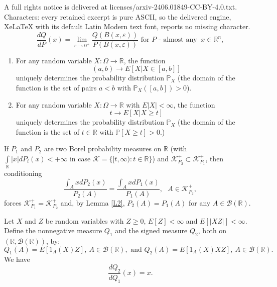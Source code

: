 \documentclass[10pt,a4paper]{amsart}
\newcommand{\B}{\mathcal{B}(\R)}
\newcommand{\KK}{\mathcal{K}}
\newcommand{\PP}{\mathbb{P}}
\newcommand{\R}{\mathbb{R}}
\newcommand{\eps}{\varepsilon}
\begin{document}
A full rights notice is delivered at licenses/arxiv-2406.01849-CC-BY-4.0.txt. Characters: every retained excerpt is pure ASCII, so the delivered engine, XeLaTeX with its default Latin Modern text font, reports no missing character.
\begin{equation}\label{RNCH}
\frac{dQ}{dP}(x)=\lim\limits_{\eps\to0^+}\frac{Q(B(x,\eps))}{P(B(x,\eps))}\mbox{  \  \  \ \ \ for\ \  }P  \mbox{\ \ - almost any }\ x\in\R^n,
\end{equation}

\begin{lemma}\label{L2}
\begin{enumerate}
\item For any random variable $X\colon\Omega\to\R$, the function
\begin{equation}\label{C1} (a,b)\to E[X|X\in [a,b] ]
\end{equation}
uniquely determines the probability distribution $\PP_X$ (the domain of the function is the set of pairs $a<b$ with $\PP_X([a,b])>0$). 
\item For any random variable $X\colon\Omega\to\R$ with $E|X|<\infty$, the function
\begin{equation}\label{C2} 
t\to E[X|X\geq t]
\end{equation}
uniquely determines the probability distribution $\PP_X$ (the domain of the function is the set of $t\in\R$ with $\PP[X\geq t]>0$.)
\end{enumerate}
\end{lemma}

\begin{observation}\label{OL2}
   If $P_1$ and $P_2$ are two Borel probability measures on $\R$ (with\\ $\int\limits_{\R}|x|dP_i(x)<+\infty$ in case $\KK=\{[t,\infty)\colon t\in\R\}$) and $\KK^+_{P_2}\subset \KK^+_{P_1}$, then conditioning 
\begin{equation}\label{W}\frac{\int_A xdP_2(x)}{P_2(A)}=\frac{\int_A xdP_1(x)}{P_1(A)}, \ \ \ A\in \KK^+_{P_2},\end{equation}
forces $\KK^+_{P_1}=\KK^+_{P_2}$ and, by Lemma \ref{L2}, $P_2(A)=P_1(A)$ for any $A\in\B$.
\end{observation}

\begin{lemma}\label{LRN}
Let $X$ and $Z$ be random variables with $Z\geq0$, $E[Z]<\infty$ and $E[|XZ|]<\infty$. Define the nonnegative measure $Q_1$ and the signed measure $Q_2$, both on $(\R,\B)$, by: 
$$Q_1(A)=E[1_A(X)Z],\ A\in\B,\mbox{ and } Q_2(A)=E[1_A(X)XZ],\ A\in\B.$$
We have $$\frac{dQ_2}{dQ_1}(x)=x.$$
\end{lemma}
\end{document}
